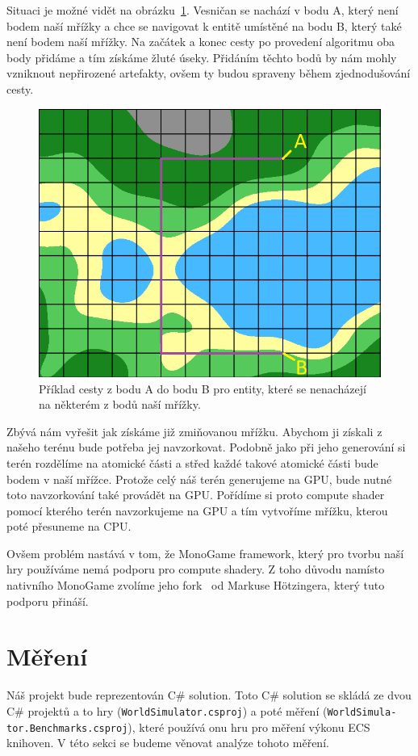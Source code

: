 Situaci je možné vidět na obrázku~\ref{fig:path_end_points}. Vesničan se nachází v bodu A, který není bodem naší mřížky a chce se navigovat k entitě umístěné na bodu B, který také není bodem naší mřížky. Na začátek a konec cesty po provedení algoritmu oba body přidáme a tím získáme žluté úseky. Přidáním těchto bodů by nám mohly vzniknout nepřirozené artefakty, ovšem ty budou spraveny během zjednodušování cesty.

\begin{figure}[!htb]
    \centering
    \includegraphics[width=0.66\linewidth]{img/path_end_points.png}
    \caption{Příklad cesty z bodu A do bodu B pro entity, které se nenacházejí na některém z bodů naší mřížky.}
    \label{fig:path_end_points}
\end{figure}

Zbývá nám vyřešit jak získáme již zmiňovanou mřížku. Abychom ji získali z našeho terénu bude potřeba jej navzorkovat. Podobně jako při jeho generování si terén rozdělíme na atomické části a střed každé takové atomické části bude bodem v naší mřížce. Protože celý náš terén generujeme na GPU, bude nutné toto navzorkování také provádět na GPU. Pořídíme si proto compute shader pomocí kterého terén navzorkujeme na GPU a tím vytvoříme mřížku, kterou poté přesuneme na CPU.

Ovšem problém nastává v tom, že MonoGame framework, který pro tvorbu naší hry používáme nemá podporu pro compute shadery. Z toho důvodu namísto nativního MonoGame zvolíme jeho fork~\cite{MonoGameCptMax} od Markuse Hötzingera, který tuto podporu přináší.

\section{Měření}
\label{benchmark-analysis}
Náš projekt bude reprezentován C\# solution. Toto C\# solution se skládá ze dvou C\# projektů a to hry (\texttt{WorldSimulator.csproj}) a poté měření (\texttt{WorldSimula-} \texttt{tor.Benchmarks.csproj}), které používá onu hru pro měření výkonu ECS knihoven. V této sekci se budeme věnovat analýze tohoto měření.

